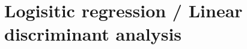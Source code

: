 \graphicspath{{Chapters/Indledning/}}

\chapter{Logisitic regression / Linear discriminant analysis}

